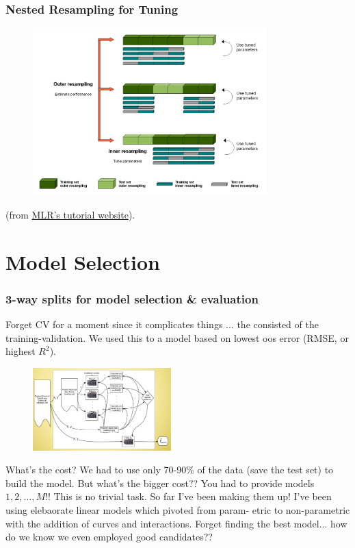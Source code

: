 \documentclass[handout]{beamer}
\begin{document}
\begin{frame}\frametitle{Nested Resampling for Tuning}

\begin{figure}
\centering
\includegraphics[width=3.56in]{nested_resampling_for_tuning.png}
\end{figure}

(from \href{https://mlr-org.github.io/mlr-tutorial/devel/html/nested_resampling/index.html}{MLR's tutorial website}).
\end{frame}

\section{Model Selection}

\begin{frame}\frametitle{3-way splits for model selection \& evaluation}
\small
Forget CV for a moment since it complicates things ... the  consisted of the training-validation. We used this to  a model based on lowest oos error (RMSE, or highest $R^2$). 

\vspace{-0.2cm}
\begin{figure}
\centering
\includegraphics[width=2.1in]{training_validation}
\end{figure}
\vspace{-0.2cm}
What's the cost? \pause We had to use only 70-90\% of the data (save the test set) to build the model. But what's the bigger cost?? \pause You had to provide models $1, 2, \ldots, M$!! This is no trivial task. So far I've been making them up! I've been using elebaorate linear models which pivoted from param- etric to non-parametric with the addition of curves and interactions. Forget finding the best model... how do we know we even employed good candidates?? \pause {}

\end{frame}
\end{document}
